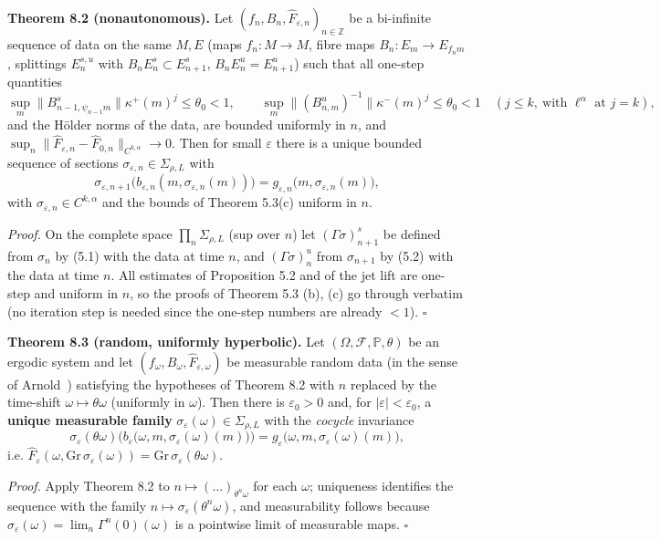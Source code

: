\documentclass[11pt,a4paper]{article}
\theoremstyle{plain}
\theoremstyle{definition}
\theoremstyle{remark}
\numberwithin{equation}{section}
\numberwithin{figure}{section}
\begin{document}
\textbf{Theorem 8.2 (nonautonomous).} Let $(f_n,B_n,\widehat F_{\varepsilon,n})_{n\in\mathbb Z}$ be a bi-infinite sequence of data on the same $M,E$ (maps $f_n:M\to M$, fibre maps $B_n:E_m\to E_{f_nm}$, splittings $E^{s,u}_n$ with $B_nE^s_n\subset E^s_{n+1}$, $B_nE^u_n=E^u_{n+1}$) such that all one-step quantities
\[
\sup_m\|B^s_{n-1,\psi_{n-1}m}\|\kappa^+(m)^j\le\theta_0<1,\qquad\sup_m\|(B^u_{n,m})^{-1}\|\kappa^-(m)^j\le\theta_0<1\quad(j\le k,\ \text{with }\ell^\alpha\text{ at }j=k),
\]
and the Hölder norms of the data, are bounded uniformly in $n$, and $\sup_n\|\widehat F_{\varepsilon,n}-\widehat F_{0,n}\|_{C^{k,\alpha}}\to0$. Then for small $\varepsilon$ there is a unique bounded sequence of sections $\sigma_{\varepsilon,n}\in\Sigma_{\rho,L}$ with
\[
\sigma_{\varepsilon,n+1}\big(b_{\varepsilon,n}(m,\sigma_{\varepsilon,n}(m))\big)=g_{\varepsilon,n}\big(m,\sigma_{\varepsilon,n}(m)\big),
\]
with $\sigma_{\varepsilon,n}\in C^{k,\alpha}$ and the bounds of Theorem 5.3(c) uniform in $n$.

\textit{Proof.} On the complete space $\prod_n\Sigma_{\rho,L}$ (sup over $n$) let $(\Gamma\sigma)^s_{n+1}$ be defined from $\sigma_n$ by (5.1) with the data at time $n$, and $(\Gamma\sigma)^u_n$ from $\sigma_{n+1}$ by (5.2) with the data at time $n$. All estimates of Proposition 5.2 and of the jet lift are one-step and uniform in $n$, so the proofs of Theorem 5.3 (b), (c) go through verbatim (no iteration step is needed since the one-step numbers are already $<1$). $\square$

\textbf{Theorem 8.3 (random, uniformly hyperbolic).} Let $(\Omega,\mathcal F,\mathbb P,\theta)$ be an ergodic system and let $(f_\omega,B_\omega,\widehat F_{\varepsilon,\omega})$ be measurable random data (in the sense of Arnold~\cite{arn98}) satisfying the hypotheses of Theorem 8.2 with $n$ replaced by the time-shift $\omega\mapsto\theta\omega$ (uniformly in $\omega$). Then there is $\varepsilon_0>0$ and, for $|\varepsilon|<\varepsilon_0$, a \textbf{unique measurable family} $\sigma_\varepsilon(\omega)\in\Sigma_{\rho,L}$ with the \textit{cocycle} invariance
\[
\sigma_\varepsilon(\theta\omega)\Big(b_\varepsilon\big(\omega,m,\sigma_\varepsilon(\omega)(m)\big)\Big)=g_\varepsilon\big(\omega,m,\sigma_\varepsilon(\omega)(m)\big),
\]
i.e. $\widehat F_{\varepsilon}(\omega,\mathrm{Gr}\,\sigma_\varepsilon(\omega))=\mathrm{Gr}\,\sigma_\varepsilon(\theta\omega)$.

\textit{Proof.} Apply Theorem 8.2 to $n\mapsto(\ldots)_{\theta^n\omega}$ for each $\omega$; uniqueness identifies the sequence with the family $n\mapsto\sigma_\varepsilon(\theta^n\omega)$, and measurability follows because $\sigma_\varepsilon(\omega)=\lim_n\Gamma^n(0)(\omega)$ is a pointwise limit of measurable maps. $\square$
\end{document}
